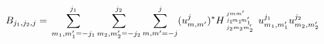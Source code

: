 \documentclass[24pt]{article}
\begin{document}
\newcommand{\hcoeff}[9]{H\!\!{\tiny\begin{array}{l}#1 #2 #3 \\ #4 #5 #6 \\ #7 #8 #9 \end{array}}}

\begin{equation}
B_{j_1,j_2,j}  = \\
\sum_{m_1,m'_1=-j_1}^{j_1}\sum_{m_2,m'_2=-j_2}^{j_2}\sum_{m,m'=-j}^{j} (u^j_{m,m'})^*
\hcoeff{j}{m}{m'}{j_1}{\!m_1}{\!m'_1}{j_2}{m_2}{m'_2}
u^{j_1}_{m_1,m'_1} u^{j_2}_{m_2,m'_2}
\end{equation}
\end{document}
